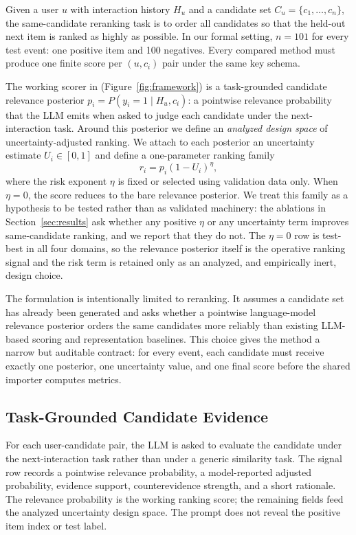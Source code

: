 Given a user $u$ with interaction history $H_u$ and a candidate set
$C_u=\{c_1,\ldots,c_n\}$, the same-candidate reranking task is to order all
candidates so that the held-out next item is ranked as highly as possible. In
our formal setting, $n=101$ for every test event: one positive item and 100
negatives. Every compared method must produce one finite score per
$(u,c_i)$ pair under the same key schema.

The working scorer in \method{} (Figure~\ref{fig:framework}) is a task-grounded
candidate relevance posterior $p_i=P(y_i=1\mid H_u,c_i)$: a pointwise relevance probability that
the LLM emits when asked to judge each candidate under the next-interaction
task. Around this posterior we define an \emph{analyzed design space} of
uncertainty-adjusted ranking. We attach to each posterior an uncertainty
estimate $U_i\in[0,1]$ and define a one-parameter ranking family
\begin{equation}
    r_i = p_i(1-U_i)^\eta ,
    \label{eq:risk-score}
\end{equation}
where the risk exponent $\eta$ is fixed or selected using validation data only.
When $\eta=0$, the score reduces to the bare relevance posterior. We treat this
family as a hypothesis to be tested rather than as validated machinery: the
ablations in Section~\ref{sec:results} ask whether any positive $\eta$ or any
uncertainty term improves same-candidate ranking, and we report that they do
not. The $\eta=0$ row is test-best in all four domains, so the relevance
posterior itself is the operative ranking signal and the risk term is retained
only as an analyzed, and empirically inert, design choice.

The formulation is intentionally limited to reranking. It assumes a candidate
set has already been generated and asks whether a pointwise language-model
relevance posterior orders the same candidates more reliably than existing
LLM-based scoring and representation baselines. This choice gives the method a
narrow but auditable contract: for every event, each candidate must receive
exactly one posterior, one uncertainty value, and one final score before the
shared importer computes metrics.

\subsection{Task-Grounded Candidate Evidence}

For each user-candidate pair, the LLM is asked to evaluate the candidate under
the next-interaction task rather than under a generic similarity task. The
signal row records a pointwise relevance probability, a model-reported adjusted
probability, evidence support, counterevidence strength, and a short rationale.
The relevance probability is the working ranking score; the remaining fields
feed the analyzed uncertainty design space. The prompt does not reveal the
positive item index or test label.

